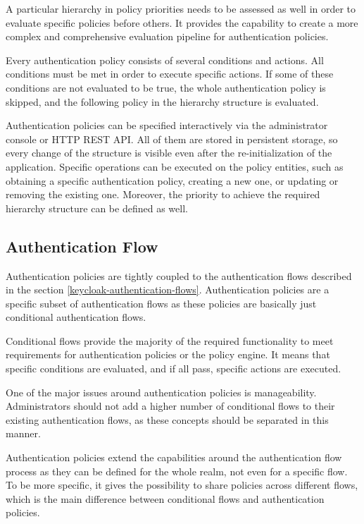 A particular hierarchy in policy priorities needs to be assessed as well in order to evaluate specific policies before others.
It provides the capability to create a more complex and comprehensive evaluation pipeline for authentication policies.

Every authentication policy consists of several conditions and actions.
All conditions must be met in order to execute specific actions.
If some of these conditions are not evaluated to be true, the whole authentication policy is skipped, and the following policy in the hierarchy structure is evaluated.

Authentication policies can be specified interactively via the administrator console or HTTP REST API.
All of them are stored in persistent storage, so every change of the structure is visible even after the re-initialization of the application. 
Specific operations can be executed on the policy entities, such as obtaining a specific authentication policy, creating a new one, or updating or removing the existing one.
Moreover, the priority to achieve the required hierarchy structure can be defined as well.

\subsection{Authentication Flow}

Authentication policies are tightly coupled to the authentication flows described in the section \ref{keycloak-authentication-flows}.
Authentication policies are a specific subset of authentication flows as these policies are basically just conditional authentication flows.

Conditional flows provide the majority of the required functionality to meet requirements for authentication policies or the policy engine.
It means that specific conditions are evaluated, and if all pass, specific actions are executed.

One of the major issues around authentication policies is manageability.
Administrators should not add a higher number of conditional flows to their existing authentication flows, as these concepts should be separated in this manner.

Authentication policies extend the capabilities around the authentication flow process as they can be defined for the whole realm, not even for a specific flow.
To be more specific, it gives the possibility to share policies across different flows, which is the main difference between conditional flows and authentication policies.

